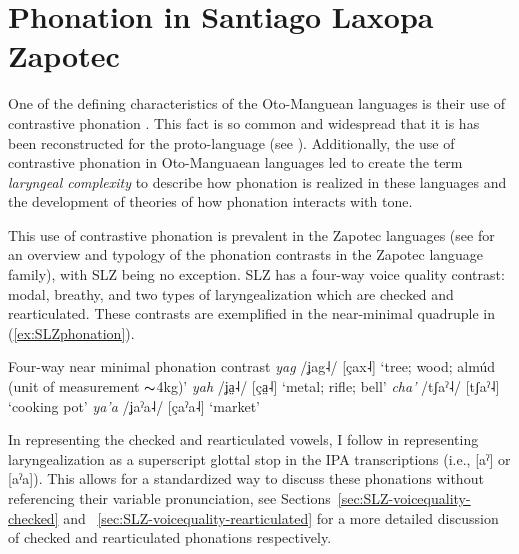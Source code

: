 \section{Phonation in Santiago Laxopa Zapotec} \label{sec:SLZ-voicequality}

One of the defining characteristics of the Oto-Manguean languages is their use of contrastive phonation \citep{campbellOtomangueanHistoricalLinguistics2017,campbellOtomangueanHistoricalLinguistics2017a}. This fact is so common and widespread that it is has been reconstructed for the proto-language (see \cite{renschComparativeOtomangueanPhonology1976}). Additionally, the use of contrastive phonation in Oto-Manguaean languages led \citet{silvermanLaryngealComplexityOtomanguean1997,silvermanPhasingRecoverability1997} to create the term \textit{laryngeal complexity} to describe how phonation is realized in these languages and the development of theories of how phonation interacts with tone. 

This use of contrastive phonation is prevalent in the Zapotec languages (see \cite{ariza-garciaPhonationTypesTones2018} for an overview and typology of the phonation contrasts in the Zapotec language family), with SLZ being no exception. SLZ
has a four-way voice quality contrast: modal, breathy, and two types of laryngealization which are checked and rearticulated. These contrasts are exemplified in the near-minimal quadruple in (\ref{ex:SLZphonation}).

\ea \label{ex:SLZphonation} Four-way near minimal phonation contrast
    \ea \textit{yag}  /ʝag˨/ [çax˨] `tree; wood; almúd (unit of measurement  $\thicksim$4kg)'
    \ex \textit{yah}  /ʝa̤˨/ [ça̤˨] `metal; rifle; bell'
    \ex \textit{cha'}  /tʃaˀ˨/ [tʃaˀ˨]  `cooking pot'
    \ex \textit{ya'a}  /ʝaˀa˨/ [çaˀa˨] `market'
    \z
\z

In representing the checked and rearticulated vowels, I follow \citet{avelinoAcousticElectroglottographicAnalyses2010, uchiharaToneRegistrogenesisQuiavini2016} in representing laryngealization as a superscript glottal stop in the IPA transcriptions (i.e., [aˀ] or [aˀa]). This allows for a standardized way to discuss these phonations without referencing their variable pronunciation, see Sections~\ref{sec:SLZ-voicequality-checked} and ~\ref{sec:SLZ-voicequality-rearticulated} for a more detailed discussion of checked and rearticulated phonations respectively. 

